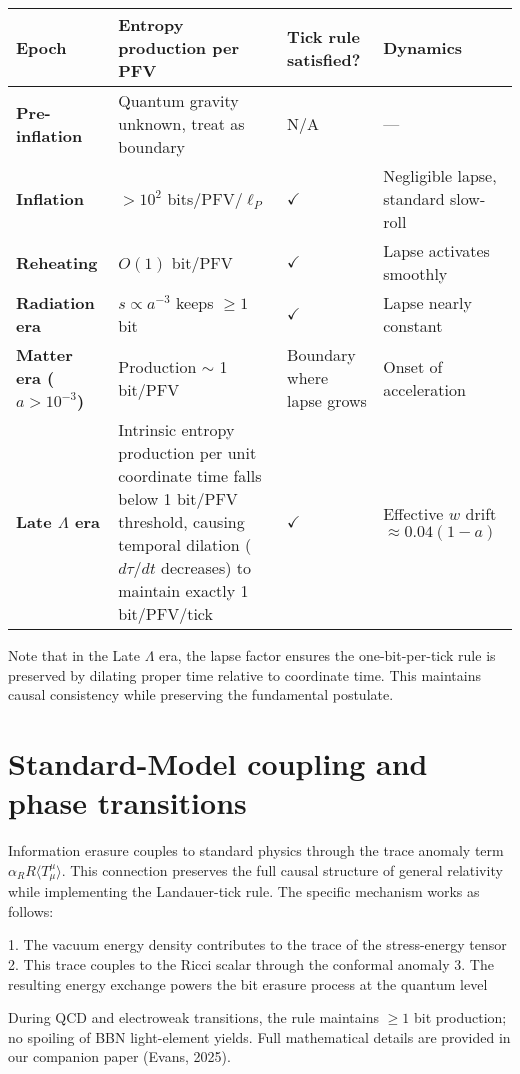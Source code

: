 \documentclass[12pt,a4paper]{article}
\newcommand{\sect}[1]{\section{#1}}
\begin{document}
\begin{table}[htbp]
\centering
\begin{tabular}{@{}p{}p{}p{}p{}@{}}
\toprule
\textbf{Epoch} & \textbf{Entropy production per PFV} & \textbf{Tick rule satisfied?} & \textbf{Dynamics} \\
\midrule
\textbf{Pre-inflation} & Quantum gravity unknown, treat as boundary & N/A & --- \\
\textbf{Inflation} & $>10^2$ bits/PFV/$\ell_P$ & $\checkmark$ & Negligible lapse, standard slow-roll \\
\textbf{Reheating} & $O(1)$ bit/PFV & $\checkmark$ & Lapse activates smoothly \\
\textbf{Radiation era} & $s \propto a^{-3}$ keeps $\geq 1$ bit & $\checkmark$ & Lapse nearly constant \\
\textbf{Matter era ($a > 10^{-3}$)} & Production $\sim$ 1 bit/PFV & Boundary where lapse grows & Onset of acceleration \\
\textbf{Late $\Lambda$ era} & Intrinsic entropy production per unit coordinate time falls below 1 bit/PFV threshold, causing temporal dilation ($d\tau/dt$ decreases) to maintain exactly 1 bit/PFV/tick & $\checkmark$ & Effective $w$ drift $\approx 0.04(1-a)$ \\
\bottomrule
\end{tabular}
\end{table}

Note that in the Late $\Lambda$ era, the lapse factor ensures the one-bit-per-tick rule is preserved by dilating proper time relative to coordinate time. This maintains causal consistency while preserving the fundamental postulate.

\sect{Standard-Model coupling and phase transitions}

Information erasure couples to standard physics through the trace anomaly term $\alpha_R R \langle T^{\mu}_{\mu} \rangle$. This connection preserves the full causal structure of general relativity while implementing the Landauer-tick rule. The specific mechanism works as follows:

1. The vacuum energy density contributes to the trace of the stress-energy tensor
2. This trace couples to the Ricci scalar through the conformal anomaly
3. The resulting energy exchange powers the bit erasure process at the quantum level

During QCD and electroweak transitions, the rule maintains $\geq 1$ bit production; no spoiling of BBN light-element yields. Full mathematical details are provided in our companion paper (Evans, 2025).
\end{document}
